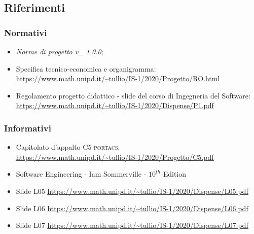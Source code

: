 \subsection{Riferimenti}



\subsubsection{Normativi}

\begin{itemize}
	\item \textit{Norme di progetto v\_ 1.0.0};
	\item Specifica tecnico-economica e organigramma: \\ \uline{\url{https://www.math.unipd.it/~tullio/IS-1/2020/Progetto/RO.html}}
	\item Regolamento progetto didattico - slide del corso di Ingegneria del Software: \\ \uline{\url{https://www.math.unipd.it/~tullio/IS-1/2020/Dispense/P1.pdf}}
\end{itemize}



\subsubsection{Informativi}
\begin{itemize}
	\item Capitolato d'appalto C5-\textsc{portacs}: \\ \uline{\url{https://www.math.unipd.it/~tullio/IS-1/2020/Progetto/C5.pdf}}
	\item Software Engineering - Iam Sommerville - $10^{th}$ Edition
	\item Slide L05
	\uline{\url{https://www.math.unipd.it/~tullio/IS-1/2020/Dispense/L05.pdf}}
	\item Slide L06
	\uline{\url{https://www.math.unipd.it/~tullio/IS-1/2020/Dispense/L06.pdf}}
	\item Slide L07
	\uline{\url{https://www.math.unipd.it/~tullio/IS-1/2020/Dispense/L07.pdf}}
\end{itemize}